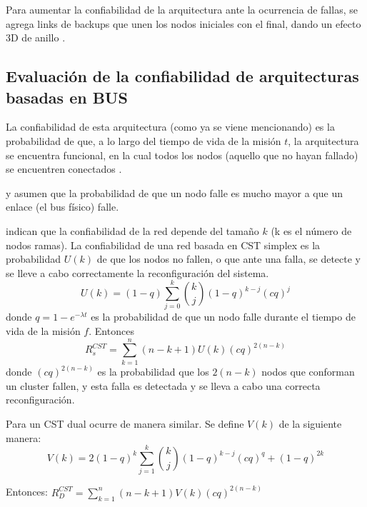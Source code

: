 Para aumentar la confiabilidad de la arquitectura ante la ocurrencia de fallas, se agrega links de backups que unen los nodos iniciales con el final, dando un efecto 3D de anillo \citep{Tai99}.

\subsection{Evaluación de la confiabilidad de arquitecturas basadas en BUS}
La confiabilidad de esta arquitectura (como ya se viene mencionando) es la probabilidad de que, a lo largo del tiempo de vida de la misión $t$, la arquitectura se encuentra funcional, en la cual todos los nodos (aquello que no hayan fallado) se encuentren conectados \citep{Tai99}.

\citep{Tai99} y \citep{Chau99} asumen que la probabilidad de que un nodo falle es mucho mayor a que un enlace (el bus físico) falle.

\cite{Tai99} indican que la confiabilidad de la red depende del tamaño $k$ (k es el número de nodos ramas). La confiabilidad de una red basada en \ac{CST} simplex es la probabilidad $U(k)$ de que los nodos no fallen, o que ante una falla, se detecte y se lleve a cabo correctamente la reconfiguración del sistema. $$U(k) = (1-q) \sum_{j=0}^{k} {{k}\choose{j}} (1-q)^{k-j} (cq)^j $$ donde $q = 1-e^{-\lambda t}$ es la probabilidad de que un nodo falle durante el tiempo de vida de la misión $f$. Entonces $$R_s^{CST} = \sum_{k=1}^n (n-k+1)U(k)(cq)^{2(n-k)}$$ donde $(cq)^{2(n-k)}$ es la probabilidad que los  $2(n-k)$ nodos que conforman un cluster fallen, y esta falla es detectada y se lleva a cabo una correcta reconfiguración.

Para un \ac{CST} dual ocurre de manera similar. Se define $V(k)$ de la siguiente manera: $$V(k) = 2(1-q)^k \sum_{j=1}^k {{k}\choose{j}} (1-q)^{k-j} (cq)^q + (1-q)^{2k}$$

Entonces:  $R_D^{CST} =  \sum_{k=1}^n (n-k+1) V(k) (cq)^{2(n-k)}$
